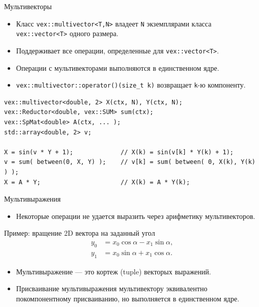 \documentclass[@BEAMER_OPTIONS@]{beamer}
\newcommand{\code}[1]{\lstinline|#1|}
\begin{document}
\begin{frame}[fragile]{Мультивекторы}
    \begin{itemize}
        \item Класс \code{vex::multivector<T,N>} владеет \code{N} экземплярами
            класса \code{vex::vector<T>} одного размера.
        \item Поддерживает все операции, определенные для
            \code{vex::vector<T>}.
        \item Операции с мультивекторами выполняются в единственном ядре.
        \item \code{vex::multivector::operator()(size_t k)} возвращает
            \code{k}-ю компоненту.
    \end{itemize}
    \begin{exampleblock}{}
        \begin{lstlisting}
vex::multivector<double, 2> X(ctx, N), Y(ctx, N);
vex::Reductor<double, vex::SUM> sum(ctx);
vex::SpMat<double> A(ctx, ... );
std::array<double, 2> v;

X = sin(v * Y + 1);             // X(k) = sin(v[k] * Y(k) + 1);
v = sum( between(0, X, Y) );    // v[k] = sum( between( 0, X(k), Y(k) ) );
X = A * Y;                      // X(k) = A * Y(k);
        \end{lstlisting}
    \end{exampleblock}
\end{frame}


\begin{frame}[fragile]{Мультивыражения}
    \begin{itemize}
        \item Некоторые операции не удается выразить через арифметику
            мультивекторов.
    \end{itemize}
    \begin{block}{Пример: вращение 2D вектора на заданный угол}
        \vspace{-1\baselineskip}
        \begin{align*}
            y_0 &= x_0 \cos \alpha - x_1 \sin \alpha, \\
            y_1 &= x_0 \sin \alpha + x_1 \cos \alpha.
        \end{align*}
    \end{block}

    \begin{itemize}
        \item Мультивыражение --- это кортеж (tuple) векторых выражений.
        \item Присваивание мультивыражения мультивектору эквивалентно
            покомпонентному присваиванию, но выполняется в единственном ядре.
    \end{itemize}
\end{frame}
\end{document}

